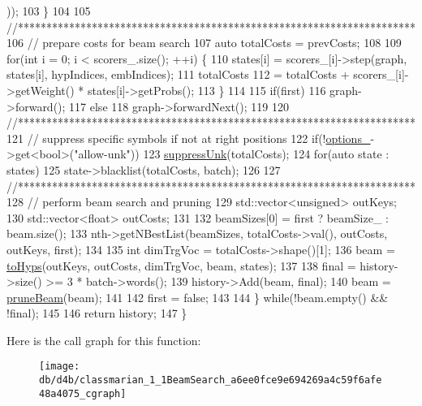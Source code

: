 \begin{DoxyCode}
      ));
103       \}
104 
105       \textcolor{comment}{//**********************************************************************}
106       \textcolor{comment}{// prepare costs for beam search}
107       \textcolor{keyword}{auto} totalCosts = prevCosts;
108 
109       \textcolor{keywordflow}{for}(\textcolor{keywordtype}{int} i = 0; i < scorers\_.size(); ++i) \{
110         states[i] = scorers\_[i]->step(graph, states[i], hypIndices, embIndices);
111         totalCosts
112             = totalCosts + scorers\_[i]->getWeight() * states[i]->getProbs();
113       \}
114 
115       \textcolor{keywordflow}{if}(first)
116         graph->forward();
117       \textcolor{keywordflow}{else}
118         graph->forwardNext();
119 
120       \textcolor{comment}{//**********************************************************************}
121       \textcolor{comment}{// suppress specific symbols if not at right positions}
122       \textcolor{keywordflow}{if}(!\hyperlink{classmarian_1_1BeamSearch_a10153afbb751f39572a14bafb141225c}{options\_}->get<\textcolor{keywordtype}{bool}>(\textcolor{stringliteral}{"allow-unk"}))
123         \hyperlink{namespacemarian_a1a6a78f80709472d63948acfbce75000}{suppressUnk}(totalCosts);
124       \textcolor{keywordflow}{for}(\textcolor{keyword}{auto} state : states)
125         state->blacklist(totalCosts, batch);
126 
127       \textcolor{comment}{//**********************************************************************}
128       \textcolor{comment}{// perform beam search and pruning}
129       std::vector<unsigned> outKeys;
130       std::vector<float> outCosts;
131 
132       beamSizes[0] = first ? beamSize\_ : beam.size();
133       nth->getNBestList(beamSizes, totalCosts->val(), outCosts, outKeys, first);
134 
135       \textcolor{keywordtype}{int} dimTrgVoc = totalCosts->shape()[1];
136       beam = \hyperlink{classmarian_1_1BeamSearch_af828b92dcf04511ea9cf2816ec9c2ee7}{toHyps}(outKeys, outCosts, dimTrgVoc, beam, states);
137 
138       \textcolor{keyword}{final} = history->size() >= 3 * batch->words();
139       history->Add(beam, \textcolor{keyword}{final});
140       beam = \hyperlink{classmarian_1_1BeamSearch_a416d9f03a6bd3f869e2dcbd1fd091390}{pruneBeam}(beam);
141 
142       first = \textcolor{keyword}{false};
143 
144     \} \textcolor{keywordflow}{while}(!beam.empty() && !\textcolor{keyword}{final});
145 
146     \textcolor{keywordflow}{return} history;
147   \}
\end{DoxyCode}


Here is the call graph for this function\+:
\nopagebreak
\begin{figure}[H]
\begin{center}
\leavevmode
\texttt{[image: db/d4b/classmarian\_1\_1BeamSearch\_a6ee0fce9e694269a4c59f6afe48a4075\_cgraph]}
\end{center}
\end{figure}


